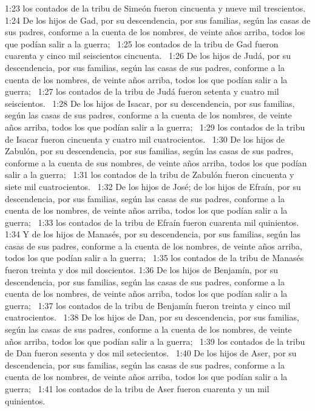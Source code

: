 1:23 los contados de la tribu de Simeón fueron cincuenta y nueve mil trescientos.  
1:24 De los hijos de Gad, por su descendencia, por sus familias, según las casas de sus padres, conforme a la cuenta de los nombres, de veinte años arriba, todos los que podían salir a la guerra;  
1:25 los contados de la tribu de Gad fueron cuarenta y cinco mil seiscientos cincuenta.  
1:26 De los hijos de Judá, por su descendencia, por sus familias, según las casas de sus padres, conforme a la cuenta de los nombres, de veinte años arriba, todos los que podían salir a la guerra;  
1:27 los contados de la tribu de Judá fueron setenta y cuatro mil seiscientos.  
1:28 De los hijos de Isacar, por su descendencia, por sus familias, según las casas de sus padres, conforme a la cuenta de los nombres, de veinte años arriba, todos los que podían salir a la guerra;  
1:29 los contados de la tribu de Isacar fueron cincuenta y cuatro mil cuatrocientos.  
1:30 De los hijos de Zabulón, por su descendencia, por sus familias, según las casas de sus padres, conforme a la cuenta de sus nombres, de veinte años arriba, todos los que podían salir a la guerra;  
1:31 los contados de la tribu de Zabulón fueron cincuenta y siete mil cuatrocientos.  
1:32 De los hijos de José; de los hijos de Efraín, por su descendencia, por sus familias, según las casas de sus padres, conforme a la cuenta de los nombres, de veinte años arriba, todos los que podían salir a la guerra;  
1:33 los contados de la tribu de Efraín fueron cuarenta mil quinientos.  
1:34 Y de los hijos de Manasés, por su descendencia, por sus familias, según las casas de sus padres, conforme a la cuenta de los nombres, de veinte años arriba, todos los que podían salir a la guerra;  
1:35 los contados de la tribu de Manasés fueron treinta y dos mil doscientos. 
1:36 De los hijos de Benjamín, por su descendencia, por sus familias, según las casas de sus padres, conforme a la cuenta de los nombres, de veinte años arriba, todos los que podían salir a la guerra;  
1:37 los contados de la tribu de Benjamín fueron treinta y cinco mil cuatrocientos.  
1:38 De los hijos de Dan, por su descendencia, por sus familias, según las casas de sus padres, conforme a la cuenta de los nombres, de veinte años arriba, todos los que podían salir a la guerra;  
1:39 los contados de la tribu de Dan fueron sesenta y dos mil setecientos.  
1:40 De los hijos de Aser, por su descendencia, por sus familias, según las casas de sus padres, conforme a la cuenta de los nombres, de veinte años arriba, todos los que podían salir a la guerra;  
1:41 los contados de la tribu de Aser fueron cuarenta y un mil quinientos.  
